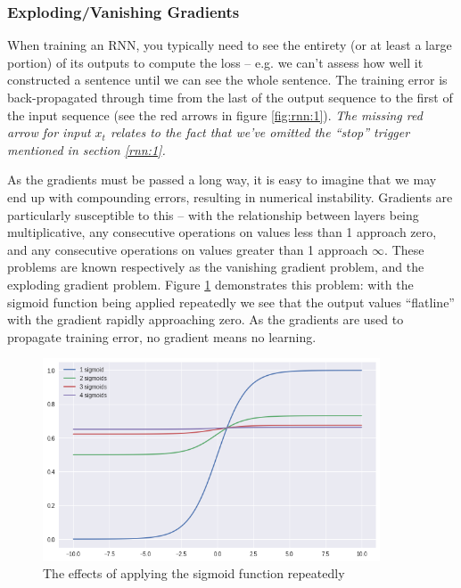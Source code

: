 \documentclass{report}
\begin{document}
	\subsubsection{Exploding/Vanishing Gradients}
	When training an RNN, you typically need to see the entirety (or at least a large portion) of its outputs to compute the loss -- e.g. we can't assess how well it constructed a sentence until we can see the whole sentence. The training error is back-propagated through time from the last of the output sequence to the first of the input sequence (see the red arrows in figure \ref{fig:rnn:1}). \textit{The missing red arrow for input $x_t$ relates to the fact that we've omitted the ``stop'' trigger mentioned in section \ref{rnn:1}.} \par
	As the gradients must be passed a long way, it is easy to imagine that we may end up with compounding errors, resulting in numerical instability. Gradients are particularly susceptible to this -- with the relationship between layers being multiplicative, any consecutive operations on values less than 1 approach zero, and any consecutive operations on values greater than 1 approach $\infty$. These problems are known respectively as the vanishing gradient problem, and the exploding gradient problem. Figure \ref{fig:multi-sigmoids:1} demonstrates this problem: with the sigmoid function being applied repeatedly we see that the output values ``flatline'' with the gradient rapidly approaching zero. As the gradients are used to propagate training error, no gradient means no learning.
	\begin{figure}[h]
		\centering
		\includegraphics[width=10cm]{multi-sigmoids}
		\caption{The effects of applying the sigmoid function repeatedly}
		\label{fig:multi-sigmoids:1}
	\end{figure}
\end{document}
